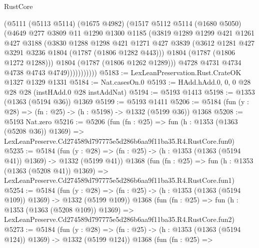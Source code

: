 \begin{lexlean}{RustCore}
\begin{coremodule}
                    (@5111
                      (@5113 @5114)
                      (@1675 @4982)
                      (@1517
                        @5112
                        @5114
                        (@1680 @5050)
                        (@4649
                          @277
                          @3809
                          @11
                          @1290
                          @1300
                          @1185
                          (@3819
                            @1289
                            @1299
                            @421
                            @1261
                            @427
                            @3188
                            (@3830
                              @1288
                              @1298
                              @421
                              @1271
                              @427
                              @3839
                              (@3612 @1281 @427 @3291 @3236 @1804 (@1787 (@1806 @1282 @443)))
                              @1804
                              (@1787 (@1806 @1272 @1288)))
                            @1804
                            (@1787 (@1806 @1262 @1289)))
                          @4728
                          @4731
                          @4734
                          @4738
                          @4743
                          @4749)))))))))))
@5183 := LexLeanPreservation.Rust.CrateOK @1327 @1329 @1331
@5184 := Nat.casesOn.{0}
@5193 := HAdd.hAdd.{0, 0, 0} @28 @28 @28 (instHAdd.{0} @28 instAddNat)
@5194 := @5193 @1413
@5198 := @1353 (@1363 (@5194 @36)) @1369
@5199 := @5193 @1411
@5206 := @5184 (fun (y : @28) => (fn : @25) -> (h : @5198) -> @1332 (@5199 @36)) @1368
@5208 := @5193 Nat.zero
@5216 := @5206
    (fun (fn : @25) =>
    fun (h : @1353 (@1363 (@5208 @36)) @1369) =>
    LexLeanPreserve.Cd274589d797775e5d286b6aa9f11ba35.R4.RustCore.fun0)
@5235 := @5184
    (fun (y : @28) => (fn : @25) -> (h : @1353 (@1363 (@5194 @41)) @1369) -> @1332 (@5199 @41))
    @1368
    (fun (fn : @25) =>
    fun (h : @1353 (@1363 (@5208 @41)) @1369) =>
    LexLeanPreserve.Cd274589d797775e5d286b6aa9f11ba35.R4.RustCore.fun1)
@5254 := @5184
    (fun (y : @28) => (fn : @25) -> (h : @1353 (@1363 (@5194 @109)) @1369) -> @1332 (@5199 @109))
    @1368
    (fun (fn : @25) =>
    fun (h : @1353 (@1363 (@5208 @109)) @1369) =>
    LexLeanPreserve.Cd274589d797775e5d286b6aa9f11ba35.R4.RustCore.fun2)
@5273 := @5184
    (fun (y : @28) => (fn : @25) -> (h : @1353 (@1363 (@5194 @124)) @1369) -> @1332 (@5199 @124))
    @1368
    (fun (fn : @25) =>

\end{coremodule}
\end{lexlean}

